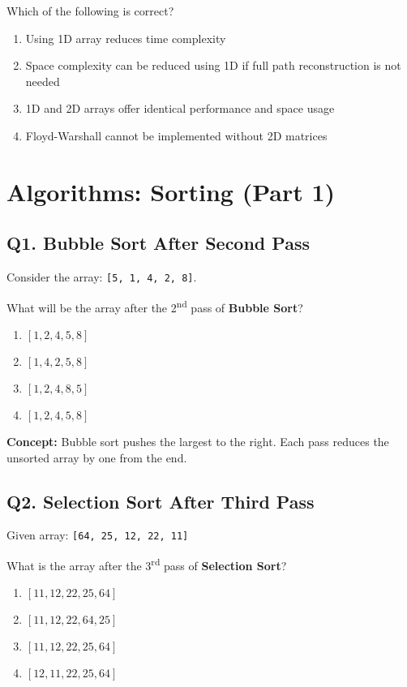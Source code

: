 Which of the following is correct?

\begin{enumerate}[label=(\alph*)]
    \item Using 1D array reduces time complexity
    \item Space complexity can be reduced using 1D if full path reconstruction is not needed
    \item 1D and 2D arrays offer identical performance and space usage
    \item Floyd-Warshall cannot be implemented without 2D matrices
\end{enumerate}


\section{Algorithms: Sorting (Part 1)}

\subsection*{Q1. Bubble Sort After Second Pass}
Consider the array: \texttt{[5, 1, 4, 2, 8]}.

What will be the array after the 2\textsuperscript{nd} pass of \textbf{Bubble Sort}?

\begin{enumerate}[label=(\alph*)]
    \item $[1, 2, 4, 5, 8]$ 
    \item $[1, 4, 2, 5, 8]$ 
    \item $[1, 2, 4, 8, 5]$ 
    \item $[1, 2, 4, 5, 8]$
\end{enumerate}

\textbf{Concept:} Bubble sort pushes the largest to the right. Each pass reduces the unsorted array by one from the end.

\newpage
\subsection*{Q2. Selection Sort After Third Pass}
Given array: \texttt{[64, 25, 12, 22, 11]}

What is the array after the 3\textsuperscript{rd} pass of \textbf{Selection Sort}?

\begin{enumerate}[label=(\alph*)]
    \item $[11, 12, 22, 25, 64]$
    \item $[11, 12, 22, 64, 25]$ 
    \item $[11, 12, 22, 25, 64]$ 
    \item $[12, 11, 22, 25, 64]$
\end{enumerate}

